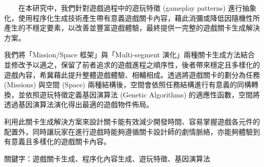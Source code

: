 　　在本研究中，我們針對遊戲過程中的遊玩特徵 (gameplay patterns) 進行抽象化，使用程序化生成技術產生帶有意義遊戲關卡內容，藉此消彌或降低因隨機性所產生的不穩定要素，以改善並豐富遊戲體驗，最終提供一完整的遊戲關卡生成解決方案。

我們將「Mission/Space 框架」與「Multi-segment 演化」兩種關卡生成方法結合並修改予以適之，保留了前者追求的遊戲進程之順序性，後者帶來穩定且多樣化的遊戲內容，希冀藉此提升整體遊戲體驗、相輔相成。透過將遊戲關卡的劃分為任務 (Missions) 與空間 (Space) 兩種結構後，空間會依照任務結構進行有意義的同構轉換，並依照遊玩特徵定義基因演算法 (Genetic Algorithms) 的適應性函數，空間將透過基因演算法演化得出最適的遊戲物件佈局。

利用此關卡生成解決方案來設計關卡能有效減少開發時間、容易掌握遊戲各元件的配置外，同時讓玩家在進行遊戲時能夠遵循關卡設計師的劇情脈絡，亦能夠體驗到有意義且多樣化的遊戲關卡內容。

關鍵字：遊戲關卡生成、程序化內容生成、遊玩特徵、基因演算法 